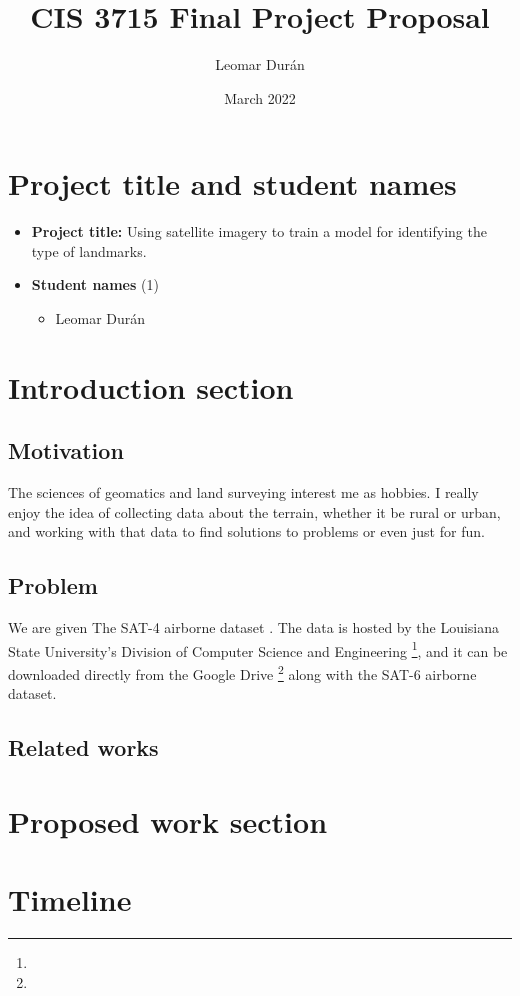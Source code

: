\documentclass[11pt]{article}
\title{CIS 3715 Final Project Proposal}
\author{Leomar Durán}
\date{March 2022}
\begin{document}
\section{Project title and student names}
\begin{itemize}
    \item
        \textbf{Project title:}
        Using satellite imagery to train a model for identifying the type of landmarks.
    \item
        \textbf{Student names} (1)
        \begin{itemize}
            \item
                Leomar Durán
        \end{itemize}
\end{itemize}

\section{Introduction section}

\subsection{Motivation}

The sciences of geomatics and land surveying interest me as hobbies.
I really enjoy the idea of collecting data about the terrain,
whether it be rural or urban,
and working with that data to find solutions to problems
or even just for fun.

\subsection{Problem}

We are given
The SAT-4 airborne dataset%
\cite{Basu2015a}.
The data is hosted by the Louisiana State University's Division of Computer Science and Engineering%
\footnote{%
},
and it can be downloaded directly from the Google Drive%
\footnote{%
}
along with the SAT-6 airborne dataset.

\subsection{Related works}

\section{Proposed work section}
\section{Timeline}

\printbibliography
\end{document}
